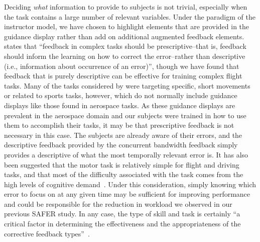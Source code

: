 Deciding \textit{what} information to provide to subjects is not trivial, especially when the task contains a large number of relevant variables.
Under the paradigm of the instructor model, we have chosen to highlight elements that are provided in the guidance display rather than add on additional augmented feedback elements.
\citeauthor{sigrist_augmented_2013} states that ``feedback in complex tasks should be prescriptive--that is, feedback should inform the learning on how to correct the error--rather than descriptive (i.e., information about occurrence of an error)'', though we have found that feedback that is purely descriptive can be effective for training complex flight tasks.
Many of the tasks considered by \citeauthor{sigrist_augmented_2013} were targeting specific, short movements or related to sports tasks, however, which do not normally include guidance displays like those found in aerospace tasks.
As these guidance displays are prevalent in the aerospace domain and our subjects were trained in how to use them to accomplish their tasks, it may be that prescriptive feedback is not necessary in this case.
The subjects are already aware of their errors, and the descriptive feedback provided by the concurrent bandwidth feedback simply provides a descriptive of what the most temporally relevant error is.
It has also been suggested that the motor task is relatively simple for flight and driving tasks, and that most of the difficulty associated with the task comes from the high levels of cognitive demand~\citep{doi:10.1080/00222899709600829}.
Under this consideration, simply knowing which error to focus on at any given time may be sufficient for improving performance and could be responsible for the reduction in workload we observed in our previous SAFER study.
In any case, the type of skill and task is certainly ``a critical factor in determining the effectiveness and the appropriateness of the corrective feedback types''~\citep{Tzetzis2008}.

